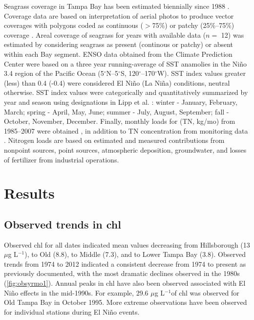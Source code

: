 \documentclass{svjour3}\usepackage[]{graphicx}\usepackage[]{color}
\newcommand{\mugl}{$\mu$g L$^{-1}$}
\begin{document}
Seagrass coverage in Tampa Bay has been estimated biennially since 1988 \cite{Tomasko05}.  Coverage data are based on interpretation of aerial photos to produce vector coverages with polygons coded as continuous ($>$75\%) or patchy (25\%--75\%) coverage \cite{SFWMD13}.  Areal coverage of seagrass for years with available data ($n=$ 12) was estimated by considering seagrass as present (continous or patchy) or absent within each Bay segment.  \ac{ENSO} data obtained from the Climate Prediction Center \cite{CPC13} were based on a three year running-average of \ac{SST} anamolies in the Ni\~{n}o 3.4 region of the Pacific Ocean (5$^{\circ}$N--5$^{\circ}$S, 120$^{\circ}$--170$^{\circ}$W).  \ac{SST} index values greater (less) than 0.4 (-0.4) were considered El Ni\~{n}o (La Ni\~{n}a) conditions, neutral otherwise.  \ac{SST} index values were categorically and quantitatively summarized by year and season using designations in Lipp et al. \cite{Lipp01}: winter - January, February, March; spring - April, May, June; summer - July, August, September; fall - October, November, December.  Finally, monthly loads for  (\acs{TN}, kg/mo) from 1985--2007 were obtained \cite{Zarbock94,Pribble01,Poe05}, in addition to \ac{TN} concentration from monitoring data \cite{TBEP11}.  Nitrogen loads are based on estimated and measured contributions from nonpoint sources, point sources, atmospheric deposition, groundwater, and losses of fertilizer from industrial operations.

\section{Results}

\subsection{Observed trends in \acl{chl}}

Observed \ac{chl} for all dates indicated mean values decreasing from Hillsborough (13 \mugl), to Old (8.8), to Middle (7.3), and to Lower Tampa Bay (3.8).  Observed trends from 1974 to 2012 indicated a consistent decrease from 1974 to present as previously documented, with the most dramatic declines observed in the 1980s (\cref{fig:obsyrmo1}).  Annual peaks in \ac{chl} have also been observed associated with El Ni\~{n}o effects \cite{Greening06} in the mid-1990s.  For example, 29.6 \mugl of \ac{chl} was observed for Old Tampa Bay in October 1995.  More extreme observations have been observed for individual stations during El Ni\~{n}o events. 
\end{document}

